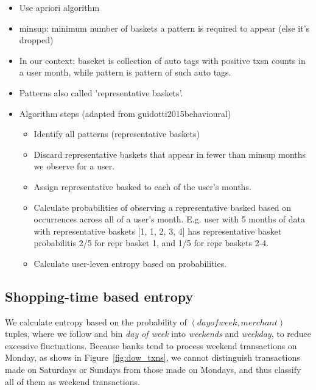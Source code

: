 \begin{itemize}
    \item Use apriori algorithm

    \item minsup: minimum number of baskets a pattern is required to appear
        (else it's dropped)

    \item In our context: baseket is collection of auto tags with positive txsn
        counts in a user month, while pattern is pattern of such auto tags.

    \item Patterns also called 'representative baskets'.

    \item Algorithm steps (adapted from guidotti2015behavioural)

        \begin{itemize}
            \item Identify all patterns (representative baskets)

            \item Discard representative baskets that appear in fewer than
                minsup months we observe for a user. 

            \item Assign representative basked to each of the user's months.

            \item Calculate probabilities of observing a representative basked
                based on occurrences across all of a user's month. E.g. user
                with 5 months of data with representative baskets [1, 1, 2, 3,
                4] has representative basket probabilitis 2/5 for repr basket
                1, and 1/5 for repr baskets 2-4.

            \item Calculate user-leven entropy based on probabilities.
        \end{itemize}
\end{itemize}





\subsection{Shopping-time based entropy}
\label{par:shopping_time_based_entropy}

We calculate entropy based on the probability of $(day of week, merchant)$
tuples, where we follow \citet{guidotti2015behavioral} and bin \textit{day of
week} into \textit{weekends} and \textit{weekday}, to reduce excessive
fluctuations. Because banks tend to process weekend transactions on Monday, as shows in
Figure~\ref{fig:dow_txns}, we cannot distinguish transactions made on Saturdays
or Sundays from those made on Mondays, and thus classify all of them as weekend
transactions.

